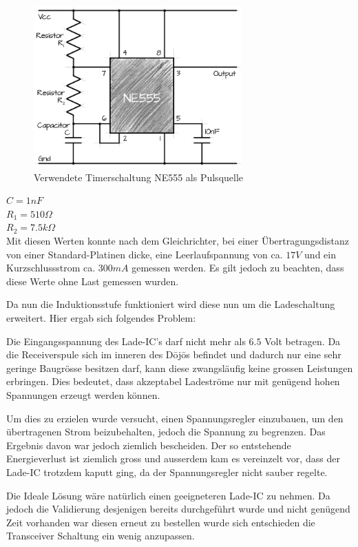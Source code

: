 \begin{figure}[H]
	\begin{center}
		\includegraphics[width=80mm]{data/Ne555circuit.png}
		\caption[Verwendete Timerschaltung NE555 als Pulsquelle]{Verwendete Timerschaltung NE555 als Pulsquelle} %
		\label{fig:NE555}
	\end{center}
\end{figure}

$C = 1nF$\\
$R_{1} = 510\Omega$\\
$R_{2} = 7.5 k\Omega$\\

Mit diesen Werten konnte nach dem Gleichrichter, bei einer Übertragungsdistanz von einer Standard-Platinen dicke, eine Leerlaufspannung von ca. $17V$ und ein Kurzschlussstrom ca. $300mA$ gemessen werden. Es gilt jedoch zu beachten, dass diese Werte ohne Last gemessen wurden. 

Da nun die Induktionsstufe funktioniert wird diese nun um die Ladeschaltung erweitert. Hier ergab sich folgendes Problem:

Die Eingangsspannung des Lade-IC’s darf nicht mehr als $6.5$ Volt betragen. Da die Receiverspule sich im inneren des Dōjōs befindet und dadurch nur eine sehr geringe Baugrösse besitzen darf, kann diese zwangsläufig keine grossen Leistungen erbringen. Dies bedeutet, dass akzeptabel Ladeströme nur mit genügend hohen Spannungen erzeugt werden können.

Um dies zu erzielen wurde versucht, einen Spannungsregler einzubauen, um den übertragenen Strom beizubehalten, jedoch die Spannung zu begrenzen. Das Ergebnis davon war jedoch ziemlich bescheiden. Der so entstehende Energieverlust ist ziemlich gross und ausserdem kam es vereinzelt vor, dass der Lade-IC trotzdem kaputt ging, da der Spannungsregler nicht sauber regelte. 

Die Ideale Lösung wäre natürlich einen geeigneteren Lade-IC zu nehmen. Da jedoch die Validierung desjenigen bereits durchgeführt wurde und nicht genügend Zeit vorhanden war diesen erneut zu bestellen wurde sich entschieden die Transceiver Schaltung ein wenig anzupassen.

